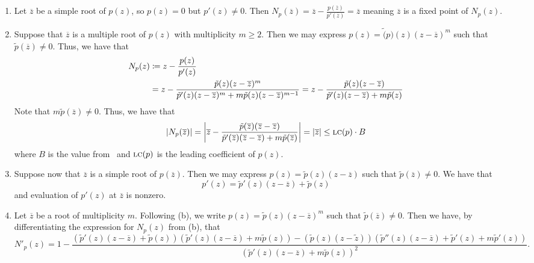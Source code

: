 \documentclass[letterpaper, 11pt, oneside]{book}
\begin{document}
\begin{pf}
  \begin{enumerate}[label= (\alph*)]
    \item Let $\overline{z}$ be a simple root of $p(z)$, so $p(z) = 0$ but $p'(z) \neq 0$.
          Then $N_{p}(\overline{z}) = \overline{z} - \frac{p(\overline{z})}{p'(\overline{z})} = \overline{z}$ meaning $\overline{z}$ is a fixed point of $N_{p}(z)$.
    \item Suppose that $\overline{z}$ is a multiple root of $p(z)$ with multiplicity $m \geq 2$.
          Then we may express $p(z) = \tilde(p)(z)(z - \overline{z})^{m}$ such that $\tilde{p}(\overline{z}) \neq 0$.
          Thus, we have that
          \begin{align*}
            N_{p}(z) &\coloneqq z - \frac{p(z)}{p'(z)} \\
            &= z - \frac{\tilde{p}(z)(z - \overline{z})^{m}}{\tilde{p}'(z)(z - \overline{z})^{m} + m\tilde{p}(z)(z - \overline{z})^{m - 1}} = z - \frac{\tilde{p}(z)(z - \overline{z})}{\tilde{p}'(z)(z - \overline{z}) + m\tilde{p}(z)}
          \end{align*}
          Note that $m\tilde{p}(\overline{z}) \neq 0$.
          Thus, we have that
          \[
            \abs{N_{p}(\overline{z})} = \abs{\overline{z} - \frac{\tilde{p}(\overline{z})(\overline{z} - \overline{z})}{\tilde{p}'(\overline{z})(\overline{z} - \overline{z}) + m\tilde{p}(\overline{z})}} = \abs{\overline{z}} \leq \operatorname{\textsc{lc}}(p) \cdot B
          \]
          where $B$ is the value from~ and $\operatorname{\textsc{lc}}(p)$ is the leading coefficient of $p(z)$.
    \item Suppose now that $\overline{z}$ is a simple root of $p(\overline{z})$.
          Then we may express $p(z) = \tilde{p}(z)(z - \overline{z})$ such that $\tilde{p}(\overline{z}) \neq 0$.
          We have that
          \[
            p'(z) = \tilde{p}'(z)(z - \overline{z}) + \tilde{p}(z)
          \]
          and evaluation of $p'(z)$ at $\overline{z}$ is nonzero.
    \item Let $\overline{z}$ be a root of multiplicity $m$.
          Following (b), we write $p(z) = \tilde{p}(z)(z - \overline{z})^{m}$ such that $\tilde{p}(\overline{z}) \neq 0$.
          Then we have, by differentiating the expression for $N_{p}(z)$ from (b), that
          \[
            N'_{p}(z) = 1 - \frac{(\tilde{p}'(z)(z - \overline{z}) + \tilde{p}(z))(\tilde{p}'(z)(z - \overline{z}) + m\tilde{p}(z)) - (\tilde{p}(z)(z - \tilde{z}))(\tilde{p}''(z)(z - \overline{z}) + \tilde{p}'(z) + m\tilde{p}'(z))}{(\tilde{p}'(z)(z - \overline{z}) + m\tilde{p}(z))^{2}}.
\]
\end{enumerate}
\end{pf}
\end{document}
